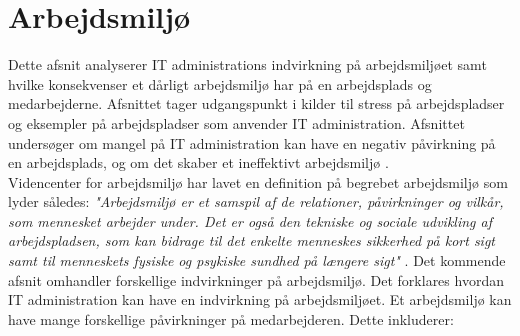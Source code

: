 


\section{Arbejdsmiljø} \label{arbejdsmiljoe}
Dette afsnit analyserer IT administrations indvirkning på arbejdsmiljøet samt hvilke konsekvenser et dårligt arbejdsmiljø har på en arbejdsplads og medarbejderne. Afsnittet tager udgangspunkt i kilder til stress på arbejdspladser og eksempler på arbejdspladser som anvender IT administration. Afsnittet undersøger om mangel på IT administration kan have en negativ påvirkning på en arbejdsplads, og om det skaber et ineffektivt arbejdsmiljø \citep{Cambridge2011}.\\

Videncenter for arbejdsmiljø har lavet en definition på begrebet arbejdsmiljø som lyder således: \textit{"Arbejdsmiljø er et samspil af de relationer, påvirkninger og vilkår, som mennesket arbejder under. Det er også den tekniske og sociale udvikling af arbejdspladsen, som kan bidrage til det enkelte menneskes sikkerhed på kort sigt samt til menneskets fysiske og psykiske sundhed på længere sigt"} \citep{Arbejdsmiljoe}. Det kommende afsnit omhandler forskellige indvirkninger på arbejdsmiljø. Det forklares hvordan IT administration kan have en indvirkning på arbejdsmiljøet. Et arbejdsmiljø kan have mange forskellige påvirkninger på medarbejderen. Dette inkluderer:


